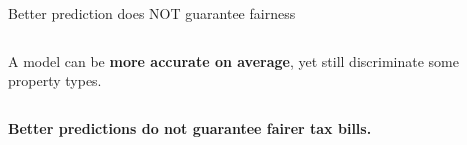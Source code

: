 \documentclass[aspectratio=169,12pt,]{beamer}
\newcommand{\1}{\mathbf{1}}
\begin{document}
\begin{frame}{Better prediction does NOT guarantee fairness}
\begin{columns}[T,onlytextwidth]
\begin{tcolorbox}[
    colback=gray!10,
    colframe=gray!75,
    arc=1mm,
    boxrule=0.6pt,
    left=4pt,right=4pt,top=4pt,bottom=4pt,
    valign=top,
    height=4.5cm
]
\begin{tcolorbox}[
    colback=white,
    colframe=gray!35,
    arc=1mm,
    boxrule=0.4pt,
    left=4pt,right=4pt,top=4pt,bottom=4pt
]
\begin{minipage}[t][2.5cm][t]{\linewidth}
\raggedright
A model can be \textbf{more accurate on average}, yet still discriminate some property types.
\end{minipage}
\end{tcolorbox}
\end{tcolorbox}
\end{columns}

\vspace{3mm}
\begin{center}
\footnotesize \textbf{Better predictions do not guarantee fairer tax bills.}
\end{center}

\end{frame}
\end{document}
